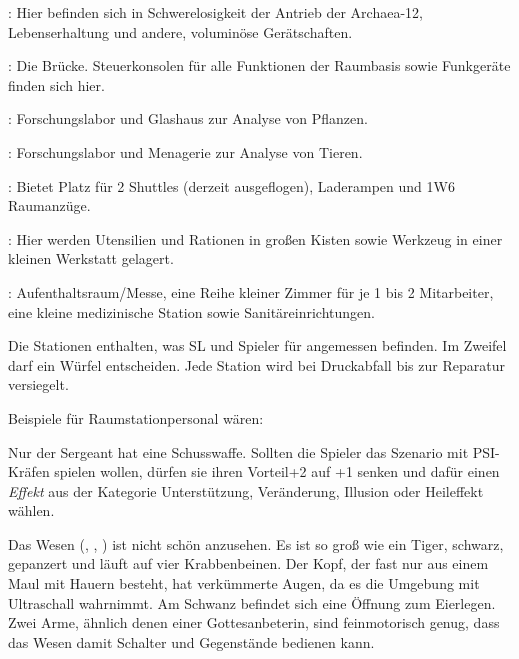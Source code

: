 {		: Hier befinden sich in Schwerelosigkeit der Antrieb der Archaea-12, Lebenserhaltung und andere, voluminöse Gerätschaften.

		: Die Brücke. Steuerkonsolen für alle Funktionen der Raumbasis sowie Funkgeräte finden sich hier.

		: Forschungslabor und Glashaus zur Analyse von Pflanzen.

		: Forschungslabor und Menagerie zur Analyse von Tieren.

		: Bietet Platz für 2 Shuttles (derzeit ausgeflogen), Laderampen und 1W6 Raumanzüge.

		: Hier werden Utensilien und Rationen in großen Kisten sowie Werkzeug in einer kleinen Werkstatt gelagert.

		: Aufenthaltsraum/Messe, eine Reihe kleiner Zimmer für je 1 bis 2 Mitarbeiter, eine kleine medizinische Station sowie Sanitäreinrichtungen.

		Die Stationen enthalten, was SL und Spieler für angemessen befinden. Im Zweifel darf ein Würfel entscheiden. Jede Station wird bei Druckabfall bis zur Reparatur versiegelt.


		\noindent
		Beispiele für Raumstationpersonal wären:


		\noindent
		Nur der Sergeant hat eine Schusswaffe. Sollten die Spieler das Szenario mit PSI-Kräfen spielen wollen, dürfen sie ihren Vorteil+2 auf +1 senken und dafür einen \emph{Effekt} aus der Kategorie Unterstützung, Veränderung, Illusion oder Heileffekt wählen.


		\noindent
		Das Wesen (, , ) ist nicht schön anzusehen. Es ist so groß wie ein Tiger, schwarz, gepanzert und läuft auf vier Krabbenbeinen. Der Kopf, der fast nur aus einem Maul mit Hauern besteht, hat verkümmerte Augen, da es die Umgebung mit Ultraschall wahrnimmt. Am Schwanz befindet sich eine Öffnung zum Eierlegen. Zwei Arme, ähnlich denen einer Gottesanbeterin, sind feinmotorisch genug, dass das Wesen damit Schalter und Gegenstände bedienen kann.

}
